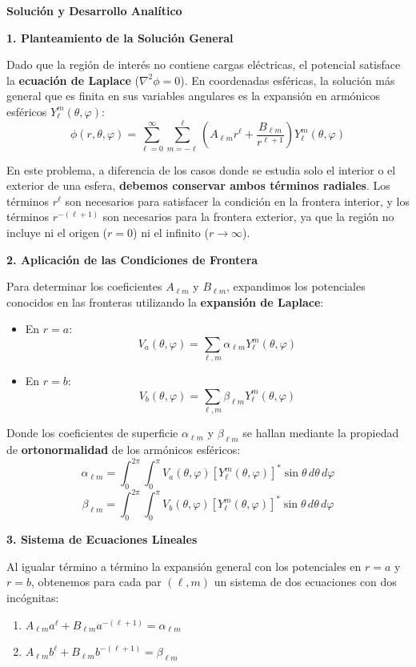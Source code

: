\documentclass[a4paper]{article}
\begin{document}
\textbf{Solución y Desarrollo Analítico}

\textbf{1. Planteamiento de la Solución General}

Dado que la región de interés no contiene cargas eléctricas, el potencial satisface la \textbf{ecuación de Laplace} ($\nabla^2\phi = 0$). En coordenadas esféricas, la solución más general que es finita en sus variables angulares es la expansión en armónicos esféricos $Y_\ell^m(\theta, \varphi)$:
$$
\phi(r, \theta, \varphi) = \sum_{\ell=0}^\infty \sum_{m=-\ell}^\ell \left( A_{\ell m} r^\ell + \frac{B_{\ell m}}{r^{\ell+1}} \right) Y_\ell^m(\theta, \varphi)
$$

En este problema, a diferencia de los casos donde se estudia solo el interior o el exterior de una esfera, \textbf{debemos conservar ambos términos radiales}. Los términos $r^\ell$ son necesarios para satisfacer la condición en la frontera interior, y los términos $r^{-(\ell+1)}$ son necesarios para la frontera exterior, ya que la región no incluye ni el origen ($r=0$) ni el infinito ($r \to \infty$).

\textbf{2. Aplicación de las Condiciones de Frontera}

Para determinar los coeficientes $A_{\ell m}$ y $B_{\ell m}$, expandimos los potenciales conocidos en las fronteras utilizando la \textbf{expansión de Laplace}:

\begin{itemize}
    \item En $r = a$: 
    $$
    V_a(\theta, \varphi) = \sum_{\ell, m} \alpha_{\ell m} Y_\ell^m(\theta, \varphi)
    $$
    
    \item En $r = b$: 
    $$
    V_b(\theta, \varphi) = \sum_{\ell, m} \beta_{\ell m} Y_\ell^m(\theta, \varphi)
    $$
\end{itemize}

Donde los coeficientes de superficie $\alpha_{\ell m}$ y $\beta_{\ell m}$ se hallan mediante la propiedad de \textbf{ortonormalidad} de los armónicos esféricos:
$$
\alpha_{\ell m} = \int_0^{2\pi} \int_0^\pi V_a(\theta, \varphi) [Y_\ell^m(\theta, \varphi)]^* \sin\theta \, d\theta \, d\varphi
$$
$$
\beta_{\ell m} = \int_0^{2\pi} \int_0^\pi V_b(\theta, \varphi) [Y_\ell^m(\theta, \varphi)]^* \sin\theta \, d\theta \, d\varphi
$$

\textbf{3. Sistema de Ecuaciones Lineales}

Al igualar término a término la expansión general con los potenciales en $r=a$ y $r=b$, obtenemos para cada par $(\ell, m)$ un sistema de dos ecuaciones con dos incógnitas:
\begin{enumerate}
    \item $A_{\ell m} a^\ell + B_{\ell m} a^{-(\ell+1)} = \alpha_{\ell m}$
    \item $A_{\ell m} b^\ell + B_{\ell m} b^{-(\ell+1)} = \beta_{\ell m}$
\end{enumerate}
\end{document}
